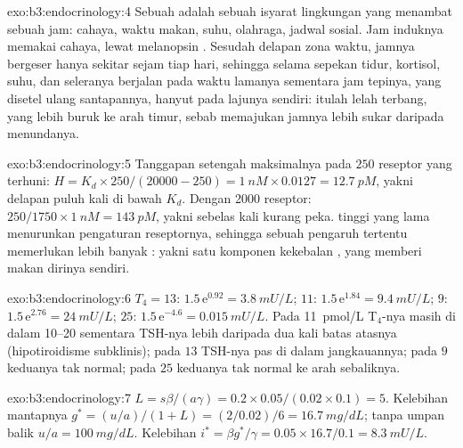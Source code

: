 \begin{solution}{exo:b3:endocrinology:4}
Sebuah  adalah sebuah isyarat lingkungan yang menambat sebuah jam: cahaya,
waktu makan, suhu, olahraga, jadwal sosial. Jam induknya
memakai cahaya, lewat  melanopsin . Sesudah
delapan zona waktu, jamnya bergeser hanya sekitar sejam tiap hari, sehingga selama
sepekan tidur, kortisol, suhu, dan seleranya berjalan pada waktu lamanya
sementara jam tepinya, yang disetel ulang santapannya, hanyut pada lajunya sendiri:
itulah lelah terbang, yang lebih buruk ke arah timur, sebab memajukan jamnya lebih sukar daripada
menundanya.
\end{solution}

\begin{solution}{exo:b3:endocrinology:5}
Tanggapan setengah maksimalnya pada $250$ reseptor yang terhuni: $H = K_{d}\times
250/(\num{20000} - 250) = \qty{1}{nM}\times 0.0127 = \qty{12.7}{pM}$,
yakni delapan puluh kali di bawah $K_{d}$. Dengan \num{2000} reseptor: $250/1750
\times \qty{1}{nM} = \qty{143}{pM}$, yakni sebelas kali kurang peka.
 tinggi yang lama menurunkan pengaturan reseptornya, sehingga sebuah pengaruh tertentu
memerlukan lebih banyak : yakni satu komponen kekebalan , yang memberi makan
dirinya sendiri.
\end{solution}

\begin{solution}{exo:b3:endocrinology:6}
$T_{4} = 13$: $1.5\,\mathrm{e}^{0.92} = \qty{3.8}{mU/L}$; $11$:
$1.5\,\mathrm{e}^{1.84} = \qty{9.4}{mU/L}$; $9$: $1.5\,\mathrm{e}^{2.76}
= \qty{24}{mU/L}$; $25$: $1.5\,\mathrm{e}^{-4.6} = \qty{0.015}{mU/L}$. Pada
\qty{11}{pmol/L} T$_{4}$-nya masih di dalam \qtyrange{10}{20}{} sementara
TSH-nya lebih daripada dua kali batas atasnya (hipotiroidisme subklinis);
pada $13$ TSH-nya pas di dalam jangkauannya; pada $9$ keduanya tak normal; pada $25$
keduanya tak normal ke arah sebaliknya.
\end{solution}

\begin{solution}{exo:b3:endocrinology:7}
$L = s\beta/(a\gamma) = 0.2\times 0.05/(0.02\times 0.1) = 5$. Kelebihan
mantapnya $g^{*} = (u/a)/(1 + L) = (2/0.02)/6 = \qty{16.7}{mg/dL}$; tanpa
umpan balik $u/a = \qty{100}{mg/dL}$. Kelebihan  $i^{*} = \beta g^{*}/
\gamma = 0.05\times 16.7/0.1 = \qty{8.3}{mU/L}$.
\end{solution}

